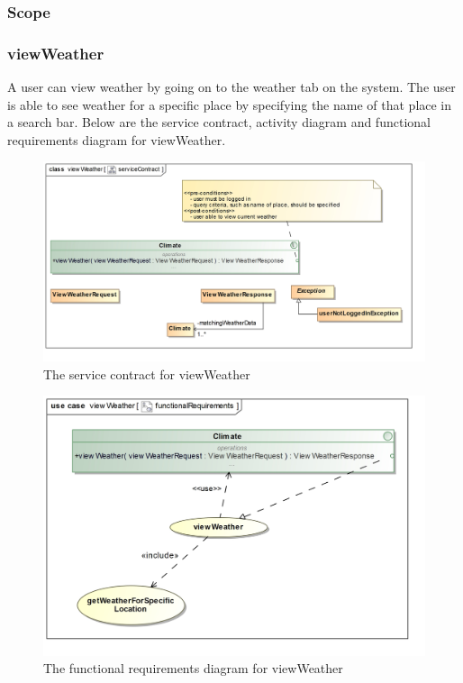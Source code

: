 \subsubsection{Scope}


\subsubsection{viewWeather}

A user can view weather by going on to the weather tab on the system. The user is able to see weather for a specific place by specifying the name of that place in a search bar. Below are the service contract, activity diagram and functional requirements diagram for viewWeather.

\begin{figure}[H]
	\centering
	\includegraphics[scale=0.23]{../images/funcReq/viewWeatherServiceContract.jpg}
	\caption{The service contract for viewWeather \label{overflow}}
\end{figure}

\begin{figure}[H]
	\centering
	\includegraphics[width=1.0\textwidth]{../images/funcReq/viewWeatherFunctionalRequirements.jpg}
	\caption{The functional requirements diagram for viewWeather \label{overflow}}
\end{figure}

